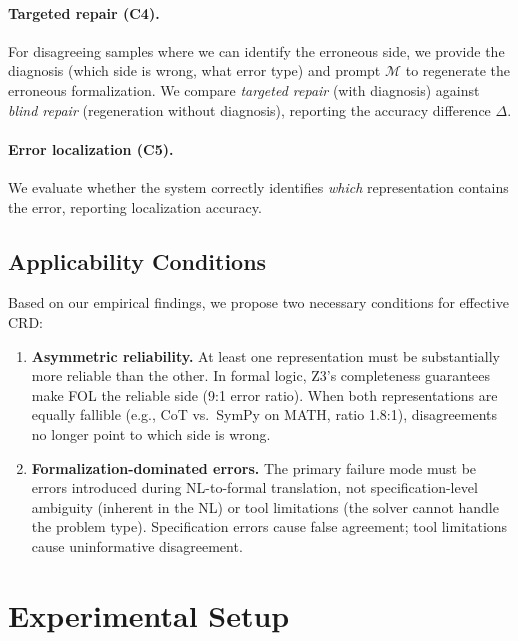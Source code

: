 \documentclass[11pt,a4paper]{article}
\begin{document}
\paragraph{Targeted repair (C4).}
For disagreeing samples where we can identify the erroneous side, we provide the diagnosis (which side is wrong, what error type) and prompt $\mathcal{M}$ to regenerate the erroneous formalization. We compare \textit{targeted repair} (with diagnosis) against \textit{blind repair} (regeneration without diagnosis), reporting the accuracy difference $\Delta$.

\paragraph{Error localization (C5).}
We evaluate whether the system correctly identifies \textit{which} representation contains the error, reporting localization accuracy.

\subsection{Applicability Conditions}

Based on our empirical findings, we propose two necessary conditions for effective CRD:

\begin{enumerate}
    \item \textbf{Asymmetric reliability.} At least one representation must be substantially more reliable than the other. In formal logic, Z3's completeness guarantees make FOL the reliable side (9:1 error ratio). When both representations are equally fallible (e.g., CoT vs.\ SymPy on MATH, ratio 1.8:1), disagreements no longer point to which side is wrong.
    \item \textbf{Formalization-dominated errors.} The primary failure mode must be errors introduced during NL-to-formal translation, not specification-level ambiguity (inherent in the NL) or tool limitations (the solver cannot handle the problem type). Specification errors cause false agreement; tool limitations cause uninformative disagreement.
\end{enumerate}

\section{Experimental Setup}
\end{document}
